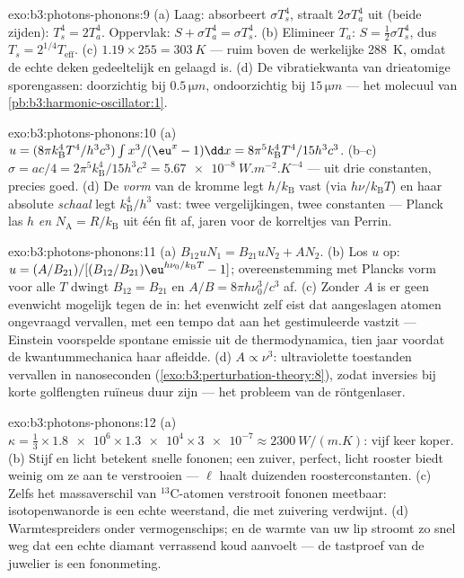 \begin{solution}{exo:b3:photons-phonons:9}
(a) Laag: absorbeert $\sigma T_s^4$, straalt $2\sigma T_a^4$ uit (beide
zijden): $T_s^4 = 2T_a^4$. Oppervlak: $S + \sigma T_a^4 = \sigma
T_s^4$. (b) Elimineer $T_a$: $S = \tfrac12\sigma T_s^4$, dus\
$T_s = 2^{1/4}T_{\text{eff}}$. (c) $1.19 \times 255 =
\qty{303}{K}$ --- ruim boven de werkelijke \qty{288}{K}, omdat de
echte deken gedeeltelijk en gelaagd is. (d) De vibratiekwanta
van drieatomige sporengassen: doorzichtig bij $0.5\,\unit{\micro m}$,
ondoorzichtig bij $15\,\unit{\micro m}$ ---
het molecuul van \cref{pb:b3:harmonic-oscillator:1}.
\end{solution}

\begin{solution}{exo:b3:photons-phonons:10}
(a) $u = (8\pi k_{\text{B}}^4T^4/h^3c^3)\int x^3/(\eu^x - 1)\dd x
= 8\pi^5k_{\text{B}}^4T^4/15h^3c^3$. (b--c) $\sigma = ac/4 =
2\pi^5k_{\text{B}}^4/15h^3c^2 = \qty{5.67e-8}{W.m^{-2}.K^{-4}}$
--- uit drie constanten, precies goed. (d) De \emph{vorm} van de kromme
legt $h/k_{\text{B}}$ vast (via $h\nu/k_{\text{B}}T$) en haar
absolute \emph{schaal} legt $k_{\text{B}}^4/h^3$ vast: twee
vergelijkingen, twee constanten --- Planck las $h$ \emph{en} $N_{\text{A}} =
R/k_{\text{B}}$ uit één fit af, jaren voor de korreltjes van Perrin.
\end{solution}

\begin{solution}{exo:b3:photons-phonons:11}
(a) $B_{12}uN_1 = B_{21}uN_2 + AN_2$. (b) Los $u$ op:
$u = (A/B_{21})/[(B_{12}/B_{21})\eu^{h\nu_0/k_{\text{B}}T} - 1]$;
overeenstemming met Plancks vorm voor alle $T$ dwingt $B_{12} = B_{21}$ en
$A/B = 8\pi h\nu_0^3/c^3$ af. (c) Zonder $A$ is er geen evenwicht
mogelijk tegen de  in: het evenwicht zelf eist dat
aangeslagen atomen ongevraagd vervallen, met een tempo dat aan het
gestimuleerde vastzit --- Einstein voorspelde spontane emissie uit
de thermodynamica, tien jaar voordat de kwantummechanica haar
afleidde. (d) $A \propto
\nu^3$: ultraviolette toestanden vervallen in nanoseconden
(\cref{exo:b3:perturbation-theory:8}), zodat inversies bij korte
golflengten ruïneus duur zijn --- het probleem van de
röntgenlaser.
\end{solution}

\begin{solution}{exo:b3:photons-phonons:12}
(a) $\kappa = \tfrac13 \times \num{1.8e6} \times \num{1.3e4}
\times \num{3e-7} \approx \qty{2300}{W/(m.K)}$: vijf keer
koper. (b) Stijf en licht betekent snelle fononen; een zuiver,
perfect, licht rooster biedt weinig om ze aan te verstrooien ---
$\ell$ haalt duizenden roosterconstanten. (c) Zelfs het
massaverschil van $^{13}$C-atomen verstrooit fononen meetbaar:
isotopenwanorde is een echte weerstand, die met zuivering
verdwijnt. (d) Warmtespreiders onder vermogenschips; en de warmte
van uw lip stroomt zo snel weg dat een echte diamant
verrassend koud aanvoelt --- de tastproef van de juwelier is een
fononmeting.
\end{solution}

